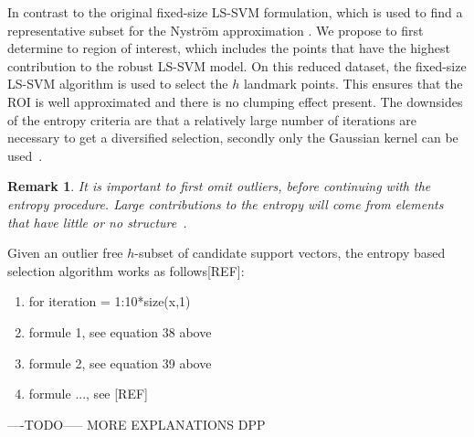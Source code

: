\documentclass[preprint,12pt]{elsarticle}
\newtheorem*{remark}{Remark}
\begin{document}
	In contrast to the original fixed-size LS-SVM formulation, which is used to find a representative subset for the Nystr\"{o}m approximation \cite{suykens2002least}. We propose to first determine to region of interest, which includes the points that have the highest contribution to the robust LS-SVM model. On this reduced dataset, the fixed-size LS-SVM algorithm is used to select the $h$ landmark points. This ensures that the ROI is well approximated and there is no clumping effect present. The downsides of the entropy criteria are that a relatively large number of iterations are necessary to get a diversified selection, secondly only the Gaussian kernel can be used~\cite{girolami2002orthogonal}.
	
	
	\begin{remark}
		It is important to first omit outliers, before continuing with the entropy procedure. Large contributions to the entropy will come from elements that have little or no structure~\cite{girolami2002orthogonal}.
	\end{remark}
	
	Given an outlier free $h$-subset of candidate support vectors, the entropy based selection algorithm works as follows[REF]:
	\begin{enumerate}
		\item for iteration = 1:10*size(x,1)
		\item formule 1, see equation 38 above
		\item formule 2, see equation 39 above
		\item formule ..., see [REF]
	\end{enumerate}
	
	----TODO-----
	MORE EXPLANATIONS DPP
	
	
\end{document}
